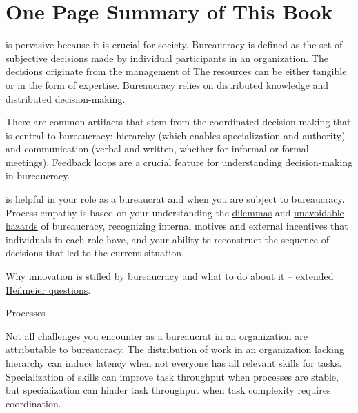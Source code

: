 \section*{One Page Summary of This Book}

\iftoggle{glossarysubstitutionworks}{\Gls{bureaucracy}}{Bureaucracy} is pervasive because it is crucial for society. Bureaucracy is defined as the set of subjective decisions made by individual participants in an organization. The decisions originate from the 
management of \iftoggle{glossarysubstitutionworks}{\glspl{shared resource}.}{shared resources.} 
The resources can be either tangible or in the form of expertise. Bureaucracy relies on
distributed knowledge and distributed decision-making.

There are common artifacts that stem from the coordinated decision-making that is central to bureaucracy: hierarchy (which enables specialization and authority) and communication (verbal and written, whether for informal or formal meetings). 
Feedback loops are a crucial feature for understanding decision-making in bureaucracy.

\iftoggle{glossarysubstitutionworks}{\Gls{process empathy}}{Process empathy} 
is helpful in your role as a bureaucrat and when you are subject to bureaucracy. 
Process empathy is based on your understanding the \hyperref[sec:dilemma-trilemma]{dilemmas} and \hyperref[sec:unavoidable-hazards]{unavoidable hazards} of bureaucracy, recognizing internal \gls{motives} and external \gls{incentives} that individuals in each role have, and your ability to reconstruct the sequence of decisions that led to the current situation. 

Why innovation is stifled by bureaucracy and what to do about it -- \hyperref[sec:extending-Heilmeier]{extended Heilmeier questions}.
\iftoggle{haspagenumbers}{page~\pageref{sec:extending-Heilmeier}}{}

Processes

Not all challenges you encounter as a bureaucrat in an organization are attributable to bureaucracy. The distribution of work in an organization lacking hierarchy can induce latency when not everyone has all relevant skills for tasks. Specialization of skills can improve task throughput when processes are stable, but specialization can hinder task throughput when task complexity requires coordination.

